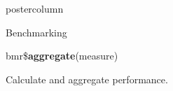 \documentclass{beamer}
\begin{document}
\begin{frame}[fragile]{}
\begin{columns}
\begin{column}{.245\textwidth}
\begin{beamercolorbox}[center]{postercolumn}
\begin{minipage}{.98\textwidth}
{\begin{myblock}{Benchmarking}
						      \begin{codebox}
							      bmr\$\textbf{aggregate}(measure)
						      \end{codebox}
						      Calculate and aggregate performance.
					        \end{myblock}\vfill
				            }
		          	\end{minipage}
		          \end{beamercolorbox}
	           \end{column}
            \end{columns}
          \end{frame}
        
\end{document}
